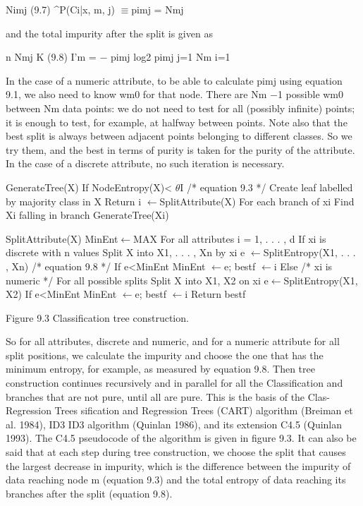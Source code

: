 Nimj (9.7) \textasciicircum{}P(Ci|x, m, j) $\equiv$pimj = Nmj

and the total impurity after the split is given as

n Nmj K (9.8) I'm = $-$ pimj log2 pimj j=1 Nm i=1

In the case of a numeric attribute, to be able to calculate pimj using equation 9.1, we also need to know wm0 for that node. There are Nm $-$1 possible wm0 between Nm data points: we do not need to test for all (possibly infinite) points; it is enough to test, for example, at halfway between points. Note also that the best split is always between adjacent points belonging to different classes. So we try them, and the best in terms of purity is taken for the purity of the attribute. In the case of a discrete attribute, no such iteration is necessary.

GenerateTree(X) If NodeEntropy(X)< $\theta$I /* equation 9.3 */ Create leaf labelled by majority class in X Return i $\leftarrow$SplitAttribute(X) For each branch of xi Find Xi falling in branch GenerateTree(Xi)

SplitAttribute(X) MinEnt$\leftarrow$MAX For all attributes i = 1, . . . , d If xi is discrete with n values Split X into X1, . . . , Xn by xi e $\leftarrow$SplitEntropy(X1, . . . , Xn) /* equation 9.8 */ If e<MinEnt MinEnt $\leftarrow$e; bestf $\leftarrow$i Else /* xi is numeric */ For all possible splits Split X into X1, X2 on xi e$\leftarrow$SplitEntropy(X1, X2) If e<MinEnt MinEnt $\leftarrow$e; bestf $\leftarrow$i Return bestf

Figure 9.3 Classification tree construction.

So for all attributes, discrete and numeric, and for a numeric attribute for all split positions, we calculate the impurity and choose the one that has the minimum entropy, for example, as measured by equation 9.8. Then tree construction continues recursively and in parallel for all the Classification and branches that are not pure, until all are pure. This is the basis of the Clas- Regression Trees sification and Regression Trees (CART) algorithm (Breiman et al. 1984), ID3 ID3 algorithm (Quinlan 1986), and its extension C4.5 (Quinlan 1993). The C4.5 pseudocode of the algorithm is given in figure 9.3. It can also be said that at each step during tree construction, we choose the split that causes the largest decrease in impurity, which is the difference between the impurity of data reaching node m (equation 9.3) and the total entropy of data reaching its branches after the split (equation 9.8).

